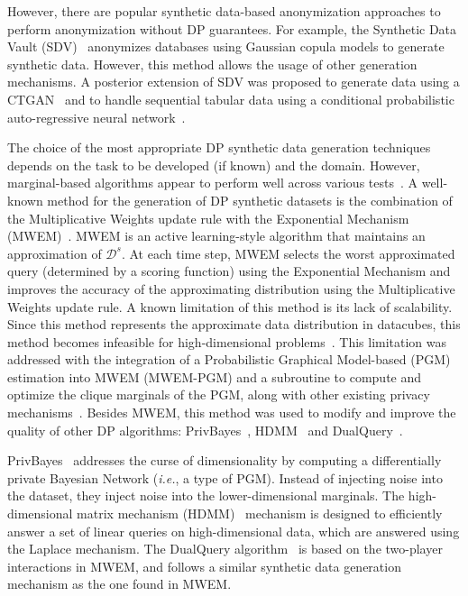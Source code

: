 \documentclass[parskip=full]{scrartcl}
\begin{document}
However, there are popular synthetic data-based anonymization approaches to
perform anonymization without DP guarantees. For example, the Synthetic Data
Vault (SDV)~\cite{patki2016synthetic} anonymizes databases using Gaussian
copula models to generate synthetic data. However, this method allows the
usage of other generation mechanisms. A posterior extension of SDV was
proposed to generate data using a CTGAN~\cite{xu2019modeling} and to handle
sequential tabular data using a conditional probabilistic auto-regressive
neural network~\cite{zhang2022sequential}. 

The choice of the most appropriate DP synthetic data generation techniques
depends on the task to be developed (if known) and the domain. However,
marginal-based algorithms appear to perform well across various
tests~\cite{tao2021benchmarking}. A well-known method for the generation of DP
synthetic datasets is the combination of the Multiplicative Weights update
rule with the Exponential Mechanism (MWEM)~\cite{hardt2012simple}. MWEM is an
active learning-style algorithm that maintains an approximation of
$\mathcal{D}^s$. At each time step, MWEM selects the worst approximated query
(determined by a scoring function) using the Exponential Mechanism and
improves the accuracy of the approximating distribution using the
Multiplicative Weights update rule. A known limitation of this method is its
lack of scalability. Since this method represents the approximate data
distribution in datacubes, this method becomes infeasible for high-dimensional
problems~\cite{mckenna2019graphical}. This limitation was addressed with the
integration of a Probabilistic Graphical Model-based (PGM) estimation into
MWEM (MWEM-PGM) and a subroutine to compute and optimize the clique marginals
of the PGM, along with other existing privacy
mechanisms~\cite{mckenna2019graphical}. Besides MWEM, this method was used to
modify and improve the quality of other DP algorithms:
PrivBayes~\cite{zhang2017privbayes}, HDMM~\cite{mckenna2018optimizing} and
DualQuery~\cite{gaboardi2014dual}.

PrivBayes~\cite{zhang2017privbayes} addresses the curse of dimensionality by
computing a differentially private Bayesian Network (\textit{i.e.}, a type of
PGM). Instead of injecting noise into the dataset, they inject noise into the
lower-dimensional marginals. The high-dimensional matrix mechanism
(HDMM)~\cite{mckenna2018optimizing} mechanism is designed to efficiently
answer a set of linear queries on high-dimensional data, which are answered
using the Laplace mechanism. The DualQuery algorithm~\cite{gaboardi2014dual}
is based on the two-player interactions in MWEM, and follows a similar
synthetic data generation mechanism as the one found in MWEM\@.
\end{document}
